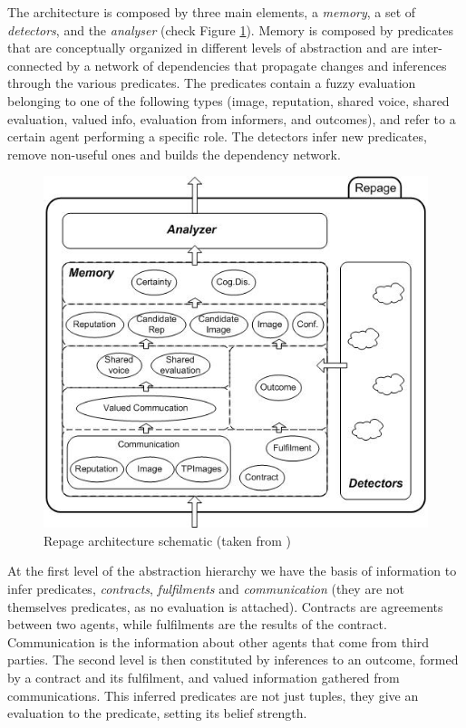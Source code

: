 The architecture is composed by three main elements, a \textit{memory}, a set of \textit{detectors}, and the \textit{analyser} (check Figure \ref{fig:Repage}). Memory is composed by predicates that are conceptually organized in different levels of abstraction and are inter-connected by a network of dependencies that propagate changes and inferences through the various predicates. The predicates contain a fuzzy evaluation belonging to one of the following types (image, reputation, shared voice, shared evaluation, valued info, evaluation from informers, and outcomes), and refer to a certain agent performing a specific role. The detectors infer new predicates, remove non-useful ones and builds the dependency network.

\begin{figure}[hbt]
    \centering
    \includegraphics[width=\textwidth]{figures/repage.jpg}
    \caption{Repage architecture schematic (taken from \cite{Sabater2006})}
    \label{fig:Repage}
\end{figure}

At the first level of the abstraction hierarchy we have the basis of information to infer predicates, \textit{contracts}, \textit{fulfilments} and \textit{communication} (they are not themselves predicates, as no evaluation is attached). Contracts are agreements between two agents, while fulfilments are the results of the contract. Communication is the information about other agents that come from third parties. The second level is then constituted by inferences to an outcome, formed by a contract and its fulfilment, and valued information gathered from communications. This inferred predicates are not just tuples, they give an evaluation to the predicate, setting its belief strength. 

